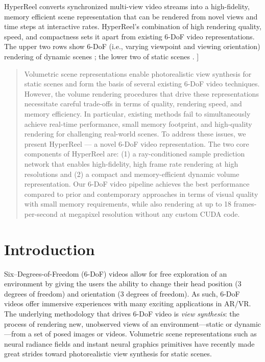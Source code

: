 \documentclass[10pt,twocolumn,letterpaper]{article}
\begin{document}
{{HyperReel converts synchronized multi-view video streams into a high-fidelity, memory efficient scene representation that can be rendered from novel views and time steps at interactive rates.
HyperReel's combination of high rendering quality, speed, and compactness sets it apart from existing 6-DoF video representations.
The upper two rows show 6-DoF (i.e., varying viewpoint and viewing orientation) rendering of dynamic scenes \cite{BroxtFOEHDDBWD2020,sabater2017dataset}; the lower two of static scenes \cite{wizadwongsa2021nex,wilburn2005high}.
}\vspace{1em} }]


\maketitle


\begin{abstract}Volumetric scene representations enable photorealistic view synthesis for static scenes and form the basis of several existing 6-DoF video techniques.
However, the volume rendering procedures that drive these representations necessitate careful trade-offs in terms of quality, rendering speed, and memory efficiency. 
In particular, existing methods fail to simultaneously achieve real-time performance, small memory footprint, and high-quality rendering for challenging real-world scenes. 
To address these issues, we present HyperReel --- a novel 6-DoF video representation.
The two core components of HyperReel are: 
(1) a ray-conditioned sample prediction network that enables high-fidelity, high frame rate rendering at high resolutions and 
(2) a compact and memory-efficient dynamic volume representation. 
Our 6-DoF video pipeline achieves the best performance compared to prior and contemporary approaches in terms of visual quality with small memory requirements, while also rendering at up to 18 frames-per-second at megapixel resolution without any custom CUDA code. 

\end{abstract} 

\section{Introduction}
\label{sec:introduction}


Six--Degrees-of-Freedom (6-DoF) videos allow for free exploration of an environment by giving the users the ability to change their head position (3 degrees of freedom) and orientation (3 degrees of freedom). 
As such, 6-DoF videos offer immersive experiences with many exciting applications in AR/VR.
The underlying methodology that drives 6-DoF video is \emph{view synthesis}: the process of rendering new, unobserved views of an environment---static or dynamic---from a set of posed images or videos.
Volumetric scene representations such as neural radiance fields \cite{MildeSTBRN2020} and instant neural graphics primitives \cite{MuelleESK2022} have recently made great strides toward photorealistic view synthesis for static scenes.
\end{document}
